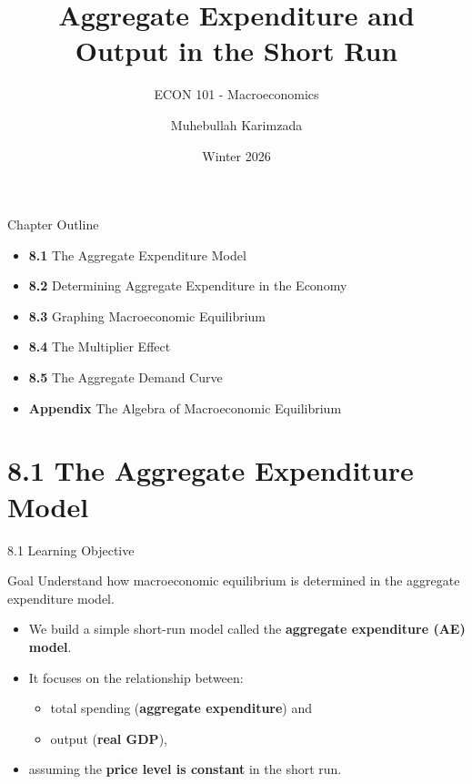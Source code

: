 \documentclass[aspectratio=169]{beamer}
\title{\textbf{Aggregate Expenditure and Output in the Short Run \vspace{.5cm}\\  }}
\subtitle{ {\large ECON 101 - Macroeconomics}}
\author{Muhebullah Karimzada}
\date{Winter 2026}
\begin{document}
\begin{frame}[plain]
  \titlepage
\end{frame}

\begin{frame}{Chapter Outline}
\transfade
\begin{itemize}
  \item \textbf{8.1} The Aggregate Expenditure Model
  \item \textbf{8.2} Determining Aggregate Expenditure in the Economy
  \item \textbf{8.3} Graphing Macroeconomic Equilibrium
  \item \textbf{8.4} The Multiplier Effect
  \item \textbf{8.5} The Aggregate Demand Curve
  \item \textbf{Appendix} The Algebra of Macroeconomic Equilibrium
\end{itemize}
\end{frame}

\section{8.1 The Aggregate Expenditure Model}

\begin{frame}{8.1 Learning Objective}
\transfade
\begin{block}{Goal}
Understand how macroeconomic equilibrium is determined in the aggregate expenditure model.
\end{block}
\begin{itemize}
  \item We build a simple short-run model called the \textbf{aggregate expenditure (AE) model}.
  \item It focuses on the relationship between:
  \begin{itemize}
    \item total spending (\textbf{aggregate expenditure}) and
    \item output (\textbf{real GDP}),
  \end{itemize}
  \item assuming the \textbf{price level is constant} in the short run.
\end{itemize}
\end{frame}
\end{document}
